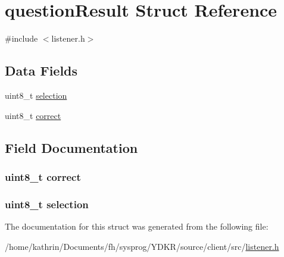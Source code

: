 \hypertarget{structquestion_result}{
\section{questionResult Struct Reference}
\label{structquestion_result}
}


{\ttfamily \#include $<$listener.h$>$}

\subsection*{Data Fields}
\begin{DoxyCompactItemize}
\item 
uint8\_\-t \hyperlink{structquestion_result_af190e8c7f8c6caf004f782b3aa7b5021}{selection}
\item 
uint8\_\-t \hyperlink{structquestion_result_a9e77be6b2d809446ab999d825cfb84f3}{correct}
\end{DoxyCompactItemize}


\subsection{Field Documentation}
\hypertarget{structquestion_result_a9e77be6b2d809446ab999d825cfb84f3}{
\subsubsection[{correct}]{\setlength{\rightskip}{0pt plus 5cm}uint8\_\-t {\bf correct}}}
\label{structquestion_result_a9e77be6b2d809446ab999d825cfb84f3}
\hypertarget{structquestion_result_af190e8c7f8c6caf004f782b3aa7b5021}{
\subsubsection[{selection}]{\setlength{\rightskip}{0pt plus 5cm}uint8\_\-t {\bf selection}}}
\label{structquestion_result_af190e8c7f8c6caf004f782b3aa7b5021}


The documentation for this struct was generated from the following file:\begin{DoxyCompactItemize}
\item 
/home/kathrin/Documents/fh/sysprog/YDKR/source/client/src/\hyperlink{listener_8h}{listener.h}\end{DoxyCompactItemize}
